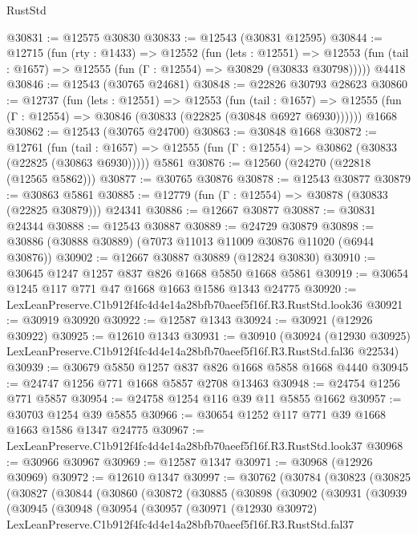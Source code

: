 \begin{lexlean}{RustStd}
\begin{coremodule}
@30831 := @12575 @30830
@30833 := @12543 (@30831 @12595)
@30844 := @12715
    (fun (rty : @1433) =>
    @12552
      (fun (lets : @12551) =>
      @12553 (fun (tail : @1657) => @12555 (fun (Γ : @12554) => @30829 (@30833 @30798)))))
    @4418
@30846 := @12543 (@30765 @24681)
@30848 := @22826 @30793 @28623
@30860 := @12737
    (fun (lets : @12551) =>
    @12553
      (fun (tail : @1657) =>
      @12555 (fun (Γ : @12554) => @30846 (@30833 (@22825 (@30848 @6927 @6930))))))
    @1668
@30862 := @12543 (@30765 @24700)
@30863 := @30848 @1668
@30872 := @12761
    (fun (tail : @1657) => @12555 (fun (Γ : @12554) => @30862 (@30833 (@22825 (@30863 @6930)))))
    @5861
@30876 := @12560 (@24270 (@22818 (@12565 @5862)))
@30877 := @30765 @30876
@30878 := @12543 @30877
@30879 := @30863 @5861
@30885 := @12779 (fun (Γ : @12554) => @30878 (@30833 (@22825 @30879))) @24341
@30886 := @12667 @30877
@30887 := @30831 @24344
@30888 := @12543 @30887
@30889 := @24729 @30879
@30898 := @30886 (@30888 @30889) (@7073 @11013 @11009 @30876 @11020 (@6944 @30876))
@30902 := @12667 @30887 @30889 (@12824 @30830)
@30910 := @30645 @1247 @1257 @837 @826 @1668 @5850 @1668 @5861
@30919 := @30654 @1245 @117 @771 @47 @1668 @1663 @1586 @1343 @24775
@30920 := LexLeanPreserve.C1b912f4fc4d4e14a28bfb70aeef5f16f.R3.RustStd.look36
@30921 := @30919 @30920
@30922 := @12587 @1343
@30924 := @30921 (@12926 @30922)
@30925 := @12610 @1343
@30931 := @30910
    (@30924
      (@12930 @30925)
      LexLeanPreserve.C1b912f4fc4d4e14a28bfb70aeef5f16f.R3.RustStd.fal36
      @22534)
@30939 := @30679 @5850 @1257 @837 @826 @1668 @5858 @1668 @4440
@30945 := @24747 @1256 @771 @1668 @5857 @2708 @13463
@30948 := @24754 @1256 @771 @5857
@30954 := @24758 @1254 @116 @39 @11 @5855 @1662
@30957 := @30703 @1254 @39 @5855
@30966 := @30654 @1252 @117 @771 @39 @1668 @1663 @1586 @1347 @24775
@30967 := LexLeanPreserve.C1b912f4fc4d4e14a28bfb70aeef5f16f.R3.RustStd.look37
@30968 := @30966 @30967
@30969 := @12587 @1347
@30971 := @30968 (@12926 @30969)
@30972 := @12610 @1347
@30997 := @30762
    (@30784
      (@30823
        (@30825
          (@30827
            (@30844
              (@30860
                (@30872
                  (@30885
                    (@30898
                      (@30902
                        (@30931
                          (@30939
                            (@30945
                              (@30948
                                (@30954
                                  (@30957
                                    (@30971
                                      (@12930 @30972)
                                      LexLeanPreserve.C1b912f4fc4d4e14a28bfb70aeef5f16f.R3.RustStd.fal37

\end{coremodule}
\end{lexlean}
